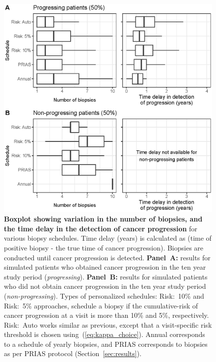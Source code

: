 \begin{figure}
\centerline{\includegraphics{images/simulation_boxplot.eps}}
\caption{\textbf{Boxplot showing variation in the number of biopsies, and the time delay in the detection of cancer progression} for various biopsy schedules. Time delay (years) is calculated as (time of positive biopsy - the true time of cancer progression). Biopsies are conducted until cancer progression is detected. \textbf{Panel~A:} results for simulated patients who obtained cancer progression in the ten year study period (\textit{progressing}). \textbf{Panel~B:} results for simulated patients who did not obtain cancer progression in the ten year study period (\textit{non-progressing}). Types of personalized schedules: Risk:~10\% and Risk:~5\% approaches, schedule a biopsy if the cumulative-risk of cancer progression at a visit is more than 10\% and 5\%, respectively. Risk:~Auto works similar as previous, except that a visit-specific risk threshold is chosen using~(\ref{eq:kappa_choice}). Annual corresponds to a schedule of yearly biopsies, and PRIAS corresponds to biopsies as per PRIAS protocol (Section~\ref{sec:results}).}
\label{fig:simulation_boxplot}
\end{figure}